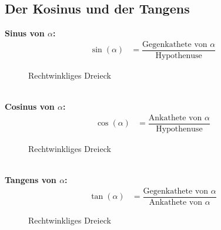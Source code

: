 \documentclass{standalone}
\begin{document}
\subsection{Der Kosinus und der Tangens}
\textbf{Sinus von $\alpha$:}
\begin{align}
  \sin(\alpha) & = \dfrac{\text{Gegenkathete von $\alpha$}}{\text{Hypothenuse}} \tag{1}
\end{align}
\begin{figure}[hb!]
  \centering
  \def\svgwidth{200px}
  
  \caption{Rechtwinkliges Dreieck}
  \label{fig:rechtwinkliges_dreieck_sinus}
\end{figure}
\\
\textbf{Cosinus von $\alpha$:}
\begin{align}
  \cos(\alpha) & = \dfrac{\text{Ankathete von $\alpha$}}{\text{Hypothenuse}} \tag{1}
\end{align}
\begin{figure}[hb!]
  \centering
  \def\svgwidth{200px}
  
  \caption{Rechtwinkliges Dreieck}
  \label{fig:rechtwinkliges_dreieck_cosinus}
\end{figure}
\\
\textbf{Tangens von $\alpha$:}
\begin{align}
  \tan(\alpha) & = \dfrac{\text{Gegenkathete von $\alpha$}}{\text{Ankathete von $\alpha$}} \tag{1}
\end{align}
\begin{figure}[hb!]
  \centering
  \def\svgwidth{200px}
  
  \caption{Rechtwinkliges Dreieck}
  \label{fig:rechtwinkliges_dreieck_tangens}
\end{figure}
\end{document}
